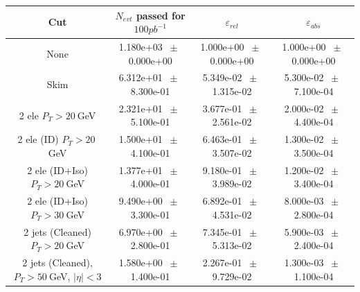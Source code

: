 \begin{table}[htbp] 
\begin{center} 
\begin{tabular}{|c|c|c|c|} 
\hline\hline 
 Cut & $N_{evt}$ passed for $100pb^{-1}$ & $\varepsilon_{rel}$ & $\varepsilon_{abs}$ \\ 
\hline\hline 
None          &           1.180e+03          $~\pm~$          0.000e+00           &           1.000e+00          $~\pm~$          0.000e+00           &           1.000e+00          $~\pm~$          0.000e+00          \\          
          Skim          &           6.312e+01          $~\pm~$          8.300e-01           &           5.349e-02          $~\pm~$          1.315e-02           &           5.300e-02          $~\pm~$          7.100e-04          \\          
          2 ele $P_T>20~$GeV          &           2.321e+01          $~\pm~$          5.100e-01           &           3.677e-01          $~\pm~$          2.561e-02           &           2.000e-02          $~\pm~$          4.400e-04          \\          
          2 ele (ID) $P_T>20~$GeV          &           1.500e+01          $~\pm~$          4.100e-01           &           6.463e-01          $~\pm~$          3.507e-02           &           1.300e-02          $~\pm~$          3.500e-04          \\          
          2 ele (ID+Iso) $P_T>20~$GeV          &           1.377e+01          $~\pm~$          4.000e-01           &           9.180e-01          $~\pm~$          3.989e-02           &           1.200e-02          $~\pm~$          3.400e-04          \\          
          2 ele (ID+Iso) $P_T>30~$GeV          &           9.490e+00          $~\pm~$          3.300e-01           &           6.892e-01          $~\pm~$          4.531e-02           &           8.000e-03          $~\pm~$          2.800e-04          \\          
          2 jets (Cleaned) $P_T>20~$GeV          &           6.970e+00          $~\pm~$          2.800e-01           &           7.345e-01          $~\pm~$          5.313e-02           &           5.900e-03          $~\pm~$          2.400e-04          \\          
          2 jets (Cleaned), $P_T>50~$GeV, $ | \eta |<3$          &           1.580e+00          $~\pm~$          1.400e-01           &           2.267e-01          $~\pm~$          9.729e-02           &           1.300e-03          $~\pm~$          1.100e-04          \\          

\end{tabular}
\end{center}
\end{table}
